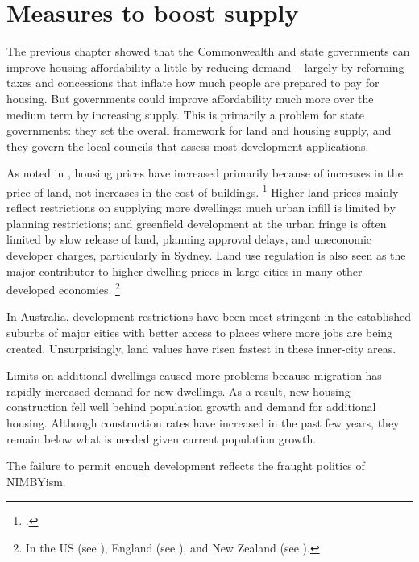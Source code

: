 \chapter{Measures to boost supply}\label{chap:boosting-housing-supply-is-critical-to-make-housing-more-affordable}

The previous chapter showed that the Commonwealth and state governments can improve housing affordability a little by reducing demand -- largely by reforming taxes and concessions that inflate how much people are prepared to pay for housing.
But governments could improve affordability much more over the medium term by increasing supply.
This is primarily a problem for state governments: they set the overall framework for land and housing supply, and they govern the local councils that assess most development applications.

As noted in , housing prices have increased primarily because of increases in the price of land, not increases in the cost of buildings.%
	\footcite{Knoll-et-al-2017-no-price-like-home}
Higher land prices mainly reflect restrictions on supplying more dwellings: much urban infill is limited by planning restrictions; and greenfield development at the urban fringe is often limited by slow release of land, planning approval delays, and uneconomic developer charges, particularly in Sydney.
Land use regulation is also seen as the major contributor to higher dwelling prices in large cities in many other developed economies.%
	\footnote{In the US (see \textcite{GlaeserGyourko2003BuildRestriction}),
     England (see \textcite{Hilber-Vermeulen-2015-Supply-constraints-effect-on-English-house-prices}),
     and New Zealand (see \textcite{Lees2017LandRegulation}).}

In Australia, development restrictions have been most stringent in the established suburbs of major cities with better access to places where more jobs are being created.
Unsurprisingly, land values have risen fastest in these inner-city areas.

Limits on additional dwellings caused more problems because migration has rapidly increased demand for new dwellings. As a result, new housing construction fell well behind population growth and demand for additional housing. Although construction rates have increased in the past few years, they remain below what is needed given current population growth.

The failure to permit enough development reflects the fraught politics of NIMBYism.

